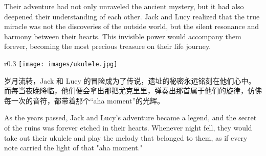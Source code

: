 \begin{flushright}
Their adventure had not only unraveled the ancient mystery, but it had also deepened their understanding of each other. Jack and Lucy realized that the true miracle was not the discoveries of the outside world, but the silent resonance and harmony between their hearts. This invisible power would accompany them forever, becoming the most precious treasure on their life journey.
\end{flushright}

\begin{wrapfigure}{r}{0.3\textwidth}  %
    \texttt{[image: images/ukulele.jpg]} %
\end{wrapfigure}

岁月流转，Jack 和 Lucy 的冒险成为了传说，遗址的秘密永远铭刻在他们心中。而每当夜晚降临，他们便会拿出那把尤克里里，弹奏出那首属于他们的旋律，仿佛每一次的音符，都带着那个“aha moment”的光辉。

\begin{flushright}
As the years passed, Jack and Lucy's adventure became a legend, and the secret of the ruins was forever etched in their hearts. Whenever night fell, they would take out their ukulele and play the melody that belonged to them, as if every note carried the light of that "aha moment."
\end{flushright}

